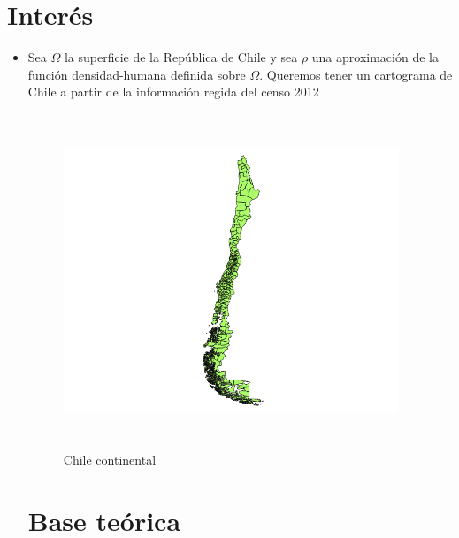 \documentclass[20pt]{report}
\begin{document}
\section{ Inter\'es}
\begin{itemize}
\item Sea $\Omega$ la superficie de la Rep\'ublica de Chile y sea $\rho$ una aproximaci\'on de la funci\'on densidad-humana definida sobre $\Omega$. Queremos tener un cartograma de Chile a partir de la informaci\'on regida del censo 2012
\\
\begin{figure}[H]
\begin{center}
\includegraphics[width=10cm, height=10cm]{Chile.png}
\vspace{-0.5cm} %
\caption{Chile continental}
\label{Label para referencia}
\end{center}
\end{figure}



\pagebreak
\label{cap.introduccion}\section{Base te\'orica}


\end{itemize}
\end{document}
